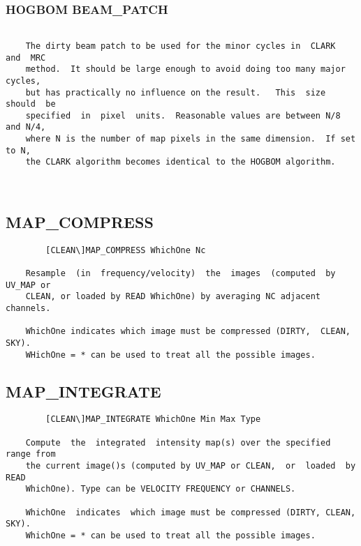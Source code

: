 \subsubsection{HOGBOM BEAM\_PATCH}
\begin{verbatim}

    The dirty beam patch to be used for the minor cycles in  CLARK  and  MRC
    method.  It should be large enough to avoid doing too many major cycles,
    but has practically no influence on the result.   This  size  should  be
    specified  in  pixel  units.  Reasonable values are between N/8 and N/4,
    where N is the number of map pixels in the same dimension.  If set to N,
    the CLARK algorithm becomes identical to the HOGBOM algorithm.



\end{verbatim}
\subsection{MAP\_COMPRESS}
\begin{verbatim}
        [CLEAN\]MAP_COMPRESS WhichOne Nc

    Resample  (in  frequency/velocity)  the  images  (computed  by UV_MAP or
    CLEAN, or loaded by READ WhichOne) by averaging NC adjacent channels.

    WhichOne indicates which image must be compressed (DIRTY,  CLEAN,  SKY).
    WHichOne = * can be used to treat all the possible images.

\end{verbatim}
\subsection{MAP\_INTEGRATE}
\begin{verbatim}
        [CLEAN\]MAP_INTEGRATE WhichOne Min Max Type

    Compute  the  integrated  intensity map(s) over the specified range from
    the current image()s (computed by UV_MAP or CLEAN,  or  loaded  by  READ
    WhichOne). Type can be VELOCITY FREQUENCY or CHANNELS.

    WhichOne  indicates  which image must be compressed (DIRTY, CLEAN, SKY).
    WhichOne = * can be used to treat all the possible images.

\end{verbatim}
